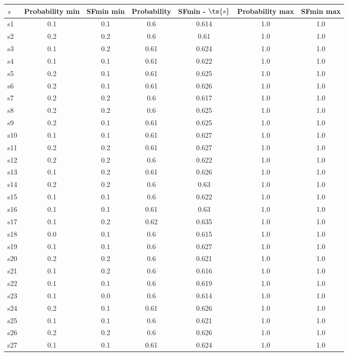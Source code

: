 \documentclass{article}
\begin{document}
\noindent\begin{tabular}{|l|c|c|c|c|c|c|}
\hline
$s$& Probability min & SFmin min & Probability & SFmin - $\ts{s}$ & Probability max & SFmin max\\
\hline
s1 &0.1 & 0.1 & 0.6 & 0.614 & 1.0 & 1.0\\
\hline
s2 &0.2 & 0.2 & 0.6 & 0.61 & 1.0 & 1.0\\
\hline
s3 &0.1 & 0.2 & 0.61 & 0.624 & 1.0 & 1.0\\
\hline
s4 &0.1 & 0.1 & 0.61 & 0.622 & 1.0 & 1.0\\
\hline
s5 &0.2 & 0.1 & 0.61 & 0.625 & 1.0 & 1.0\\
\hline
s6 &0.2 & 0.1 & 0.61 & 0.626 & 1.0 & 1.0\\
\hline
s7 &0.2 & 0.2 & 0.6 & 0.617 & 1.0 & 1.0\\
\hline
s8 &0.2 & 0.2 & 0.6 & 0.625 & 1.0 & 1.0\\
\hline
s9 &0.2 & 0.1 & 0.61 & 0.625 & 1.0 & 1.0\\
\hline
s10 &0.1 & 0.1 & 0.61 & 0.627 & 1.0 & 1.0\\
\hline
s11 &0.2 & 0.2 & 0.61 & 0.627 & 1.0 & 1.0\\
\hline
s12 &0.2 & 0.2 & 0.6 & 0.622 & 1.0 & 1.0\\
\hline
s13 &0.1 & 0.2 & 0.61 & 0.626 & 1.0 & 1.0\\
\hline
s14 &0.2 & 0.2 & 0.6 & 0.63 & 1.0 & 1.0\\
\hline
s15 &0.1 & 0.1 & 0.6 & 0.622 & 1.0 & 1.0\\
\hline
s16 &0.1 & 0.1 & 0.61 & 0.63 & 1.0 & 1.0\\
\hline
s17 &0.1 & 0.2 & 0.62 & 0.635 & 1.0 & 1.0\\
\hline
s18 &0.0 & 0.1 & 0.6 & 0.615 & 1.0 & 1.0\\
\hline
s19 &0.1 & 0.1 & 0.6 & 0.627 & 1.0 & 1.0\\
\hline
s20 &0.2 & 0.2 & 0.6 & 0.621 & 1.0 & 1.0\\
\hline
s21 &0.1 & 0.2 & 0.6 & 0.616 & 1.0 & 1.0\\
\hline
s22 &0.1 & 0.1 & 0.6 & 0.619 & 1.0 & 1.0\\
\hline
s23 &0.1 & 0.0 & 0.6 & 0.614 & 1.0 & 1.0\\
\hline
s24 &0.2 & 0.1 & 0.61 & 0.626 & 1.0 & 1.0\\
\hline
s25 &0.1 & 0.1 & 0.6 & 0.621 & 1.0 & 1.0\\
\hline
s26 &0.2 & 0.2 & 0.6 & 0.626 & 1.0 & 1.0\\
\hline
s27 &0.1 & 0.1 & 0.61 & 0.624 & 1.0 & 1.0\\

\end{tabular}
\end{document}

